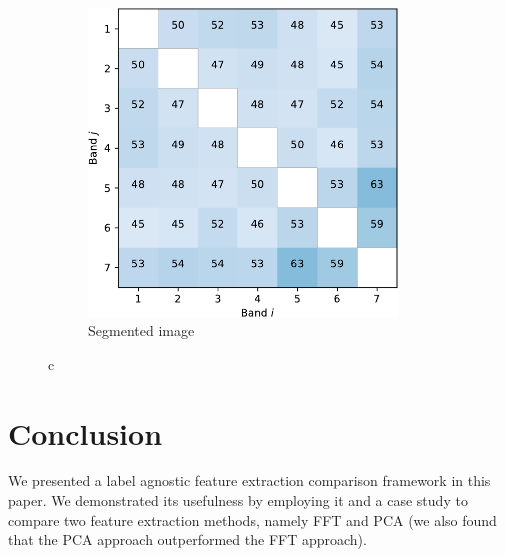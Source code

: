 \documentclass{article}
\begin{document}
\begin{figure}[h]
\begin{subfigure}[b]{0.49\linewidth}
    \label{fig7:c} 
  \end{subfigure}%
  \begin{subfigure}[b]{0.49\linewidth}
    \centering
    \includegraphics[width=0.9\textwidth]{gmm-crop.pdf} 
    \caption{Segmented image} 
    \label{fig7:d} 
  \end{subfigure} 
  \caption{c}
  \label{fig7} 
\end{figure}





\section{Conclusion}
\label{sec:ref}
We presented a label agnostic feature extraction comparison framework in this paper. We demonstrated its usefulness by employing it and a case study to compare two feature extraction methods,
namely FFT and PCA (we also found that the PCA approach outperformed the FFT approach).




\end{document}
